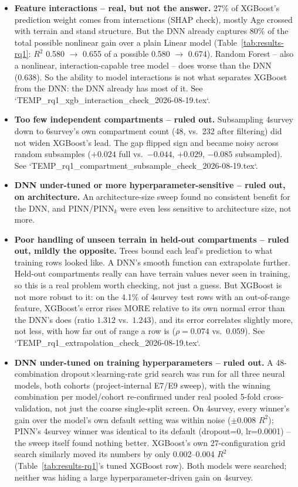 \begin{itemize}
\item \textbf{Feature interactions -- real, but not the answer.} 27\% of XGBoost's prediction
weight comes from interactions (SHAP check), mostly Age crossed with terrain and stand structure.
But the DNN already captures 80\% of the total possible nonlinear gain over a plain Linear model
(Table~\ref{tab:results-rq1}: $R^2$ 0.580 $\to$ 0.655 of a possible 0.580 $\to$ 0.674). Random
Forest -- also a nonlinear, interaction-capable tree model -- does worse than the DNN (0.638). So
the ability to model interactions is not what separates XGBoost from the DNN: the DNN already has
most of it. See `TEMP_rq1_xgb_interaction_check_2026-08-19.tex`.
\item \textbf{Too few independent compartments -- ruled out.} Subsampling 4survey down to
6survey's own compartment count (48, vs.\ 232 after filtering) did not widen XGBoost's lead. The
gap flipped sign and became noisy across random subsamples ($+0.024$ full vs.\ $-0.044$, $+0.029$,
$-0.085$ subsampled). See `TEMP_rq1_compartment_subsample_check_2026-08-19.tex`.
\item \textbf{DNN under-tuned or more hyperparameter-sensitive -- ruled out, on architecture.} An
architecture-size sweep found no consistent benefit for the DNN, and PINN/PINN$_k$ were even less
sensitive to architecture size, not more.
\item \textbf{Poor handling of unseen terrain in held-out compartments -- ruled out, mildly the
opposite.} Trees bound each leaf's prediction to what training rows looked like. A DNN's smooth
function can extrapolate further. Held-out compartments really can have terrain values never seen
in training, so this is a real problem worth checking, not just a guess. But XGBoost is not more
robust to it: on the 4.1\% of 4survey test rows with an out-of-range feature, XGBoost's error
rises MORE relative to its own normal error than the DNN's does (ratio $1.312$ vs.\ $1.243$), and
its error correlates slightly more, not less, with how far out of range a row is ($\rho=0.074$
vs.\ $0.059$). See `TEMP_rq1_extrapolation_check_2026-08-19.tex`.
\item \textbf{DNN under-tuned on training hyperparameters -- ruled out.} A 48-combination
dropout$\times$learning-rate grid search was run for all three neural models, both cohorts
(project-internal E7/E9 sweep), with the winning combination per model/cohort re-confirmed under
real pooled 5-fold cross-validation, not just the coarse single-split screen. On 4survey, every
winner's gain over the model's own default setting was within noise ($\pm0.008$ $R^2$); PINN's
4survey winner was identical to its default (dropout=0, lr=0.0001) -- the sweep itself found
nothing better. XGBoost's own 27-configuration grid search similarly moved its numbers by only
0.002--0.004 $R^2$ (Table~\ref{tab:results-rq1}'s tuned XGBoost row). Both models were searched;
neither was hiding a large hyperparameter-driven gain on 4survey.
\end{itemize}

